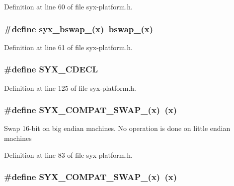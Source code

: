 Definition at line 60 of file syx-platform.h.\hypertarget{syx-platform_8h_0032b7dbe9fd3f3ad2deee119f517180}{
\subsubsection{\setlength{\rightskip}{0pt plus 5cm}\#define syx\_\-bswap\_(x)~bswap\_(x)}}
\label{syx-platform_8h_0032b7dbe9fd3f3ad2deee119f517180}




Definition at line 61 of file syx-platform.h.\hypertarget{syx-platform_8h_6cade4ec30c903ca50c7b45775e2aeae}{
\subsubsection{\setlength{\rightskip}{0pt plus 5cm}\#define SYX\_\-CDECL}}
\label{syx-platform_8h_6cade4ec30c903ca50c7b45775e2aeae}




Definition at line 125 of file syx-platform.h.\hypertarget{syx-platform_8h_7243fce3949aef0f36062013ef55d850}{
\subsubsection{\setlength{\rightskip}{0pt plus 5cm}\#define SYX\_\-COMPAT\_\-SWAP\_(x)~(x)}}
\label{syx-platform_8h_7243fce3949aef0f36062013ef55d850}


Swap 16-bit on big endian machines. No operation is done on little endian machines 

Definition at line 83 of file syx-platform.h.\hypertarget{syx-platform_8h_71465e87bba943fefbd104237bd051ee}{
\subsubsection{\setlength{\rightskip}{0pt plus 5cm}\#define SYX\_\-COMPAT\_\-SWAP\_(x)~(x)}}
\label{syx-platform_8h_71465e87bba943fefbd104237bd051ee}


